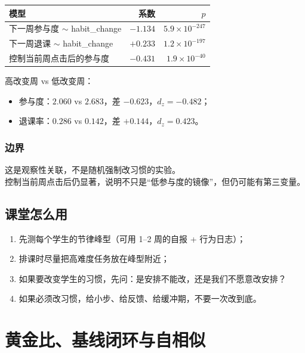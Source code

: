 \documentclass[UTF8,a4paper,11pt]{ctexart}
\begin{document}
\begin{center}
\begin{longtable}{@{}lrr@{}}
\toprule
\textbf{模型} & \textbf{系数} & \textbf{$p$} \\
\midrule
下一周参与度 $\sim$ habit\_change & $-1.134$ & $5.9\times10^{-247}$ \\
下一周退课 $\sim$ habit\_change & $+0.233$ & $1.2\times10^{-197}$ \\
控制当前周点击后的参与度 & $-0.431$ & $1.9\times10^{-40}$ \\
\bottomrule
\end{longtable}
\end{center}

高改变周 vs 低改变周：

\begin{itemize}[leftmargin=2em]
\item 参与度：$2.060$ vs $2.683$，差 $-0.623$，$d_z=-0.482$；
\item 退课率：$0.286$ vs $0.142$，差 $+0.144$，$d_z=0.423$。
\end{itemize}

\subsubsection{边界}

这是观察性关联，不是随机强制改习惯的实验。\\
控制当前周点击后仍显著，说明不只是“低参与度的镜像”，但仍可能有第三变量。

\subsection{课堂怎么用}

\begin{enumerate}[leftmargin=2em]
\item 先测每个学生的节律峰型（可用 1--2 周的自报 + 行为日志）；
\item 排课时尽量把高难度任务放在峰型附近；
\item 如果要改变学生的习惯，先问：是安排不能改，还是我们不愿意改安排？
\item 如果必须改习惯，给小步、给反馈、给缓冲期，不要一次改到底。
\end{enumerate}

\newpage

\section{黄金比、基线闭环与自相似}
\end{document}
